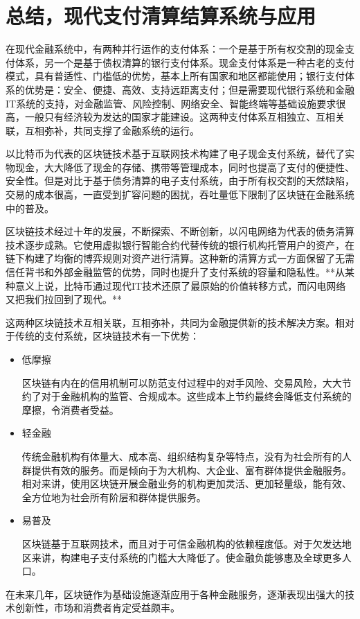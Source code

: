 \section{总结，现代支付清算结算系统与应用}

在现代金融系统中，有两种并行运作的支付体系：一个是基于所有权交割的现金支付体系，另一个是基于债权清算的银行支付体系。现金支付体系是一种古老的支付模式，具有普适性、门槛低的优势，基本上所有国家和地区都能使用；银行支付体系的优势是：安全、便捷、高效、支持远距离支付；但是需要现代银行系统和金融IT系统的支持，对金融监管、风险控制、网络安全、智能终端等基础设施要求很高，一般只有经济较为发达的国家才能建设。这两种支付体系互相独立、互相关联，互相弥补，共同支撑了金融系统的运行。

以比特币为代表的区块链技术基于互联网技术构建了电子现金支付系统，替代了实物现金，大大降低了现金的存储、携带等管理成本，同时也提高了支付的便捷性、安全性。但是对比于基于债务清算的电子支付系统，由于所有权交割的天然缺陷，交易的成本很高，一直受到扩容问题的困扰，吞吐量低下限制了区块链在金融系统中的普及。

区块链技术经过十年的发展，不断探索、不断创新，以闪电网络为代表的债务清算技术逐步成熟。它使用虚拟银行智能合约代替传统的银行机构托管用户的资产，在链下构建了均衡的博弈规则对资产进行清算。这种新的清算方式一方面保留了无需信任背书和外部金融监管的优势，同时也提升了支付系统的容量和隐私性。**从某种意义上说，比特币通过现代IT技术还原了最原始的价值转移方式，而闪电网络又把我们拉回到了现代。**

这两种区块链技术互相关联，互相弥补，共同为金融提供新的技术解决方案。相对于传统的支付系统，区块链技术有一下优势：

\begin{itemize}
    \item 低摩擦
    
    区块链有内在的信用机制可以防范支付过程中的对手风险、交易风险，大大节约了对于金融机构的监管、合规成本。这些成本上节约最终会降低支付系统的摩擦，令消费者受益。
    
    \item 轻金融
    
    传统金融机构有体量大、成本高、组织结构复杂等特点，没有为社会所有的人群提供有效的服务。而是倾向于为大机构、大企业、富有群体提供金融服务。相对来讲，使用区块链开展金融业务的机构更加灵活、更加轻量级，能有效、全方位地为社会所有阶层和群体提供服务。
    
    \item 易普及
    
    区块链基于互联网技术，而且对于可信金融机构的依赖程度低。对于欠发达地区来讲，构建电子支付系统的门槛大大降低了。使金融负能够惠及全球更多人口。
   
\end{itemize}

在未来几年，区块链作为基础设施逐渐应用于各种金融服务，逐渐表现出强大的技术创新性，市场和消费者肯定受益颇丰。

